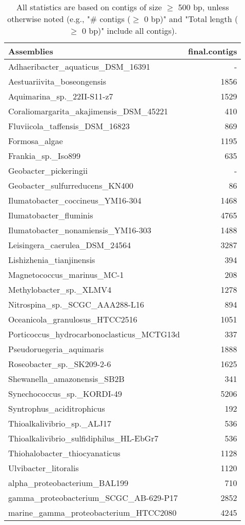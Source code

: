 \documentclass[12pt,a4paper]{article}
\begin{document}
\begin{table}[ht]
\begin{center}
\caption{All statistics are based on contigs of size $\geq$ 500 bp, unless otherwise noted (e.g., "\# contigs ($\geq$ 0 bp)" and "Total length ($\geq$ 0 bp)" include all contigs).}
\begin{tabular}{|l*{1}{|r}|}
\hline
Assemblies & final.contigs \\ \hline
Adhaeribacter\_aquaticus\_DSM\_16391 & - \\ \hline
Aestuariivita\_boseongensis & 1856 \\ \hline
Aquimarina\_sp.\_22II-S11-z7 & 1529 \\ \hline
Coraliomargarita\_akajimensis\_DSM\_45221 & 410 \\ \hline
Fluviicola\_taffensis\_DSM\_16823 & 869 \\ \hline
Formosa\_algae & 1195 \\ \hline
Frankia\_sp.\_Iso899 & 635 \\ \hline
Geobacter\_pickeringii & - \\ \hline
Geobacter\_sulfurreducens\_KN400 & 86 \\ \hline
Ilumatobacter\_coccineus\_YM16-304 & 1468 \\ \hline
Ilumatobacter\_fluminis & 4765 \\ \hline
Ilumatobacter\_nonamiensis\_YM16-303 & 1488 \\ \hline
Leisingera\_caerulea\_DSM\_24564 & 3287 \\ \hline
Lishizhenia\_tianjinensis & 394 \\ \hline
Magnetococcus\_marinus\_MC-1 & 208 \\ \hline
Methylobacter\_sp.\_XLMV4 & 1278 \\ \hline
Nitrospina\_sp.\_SCGC\_AAA288-L16 & 894 \\ \hline
Oceanicola\_granulosus\_HTCC2516 & 1051 \\ \hline
Porticoccus\_hydrocarbonoclasticus\_MCTG13d & 337 \\ \hline
Pseudoruegeria\_aquimaris & 1888 \\ \hline
Roseobacter\_sp.\_SK209-2-6 & 1625 \\ \hline
Shewanella\_amazonensis\_SB2B & 341 \\ \hline
Synechococcus\_sp.\_KORDI-49 & 5206 \\ \hline
Syntrophus\_aciditrophicus & 192 \\ \hline
Thioalkalivibrio\_sp.\_ALJ17 & 536 \\ \hline
Thioalkalivibrio\_sulfidiphilus\_HL-EbGr7 & 536 \\ \hline
Thiohalobacter\_thiocyanaticus & 1128 \\ \hline
Ulvibacter\_litoralis & 1120 \\ \hline
alpha\_proteobacterium\_BAL199 & 710 \\ \hline
gamma\_proteobacterium\_SCGC\_AB-629-P17 & 2852 \\ \hline
marine\_gamma\_proteobacterium\_HTCC2080 & 4245 \\ \hline
\end{tabular}
\end{center}
\end{table}
\end{document}
